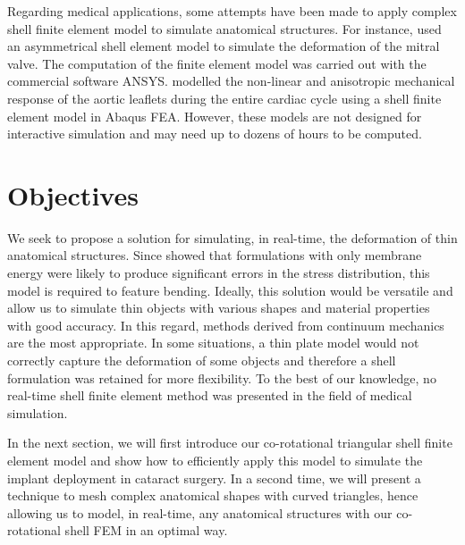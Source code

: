 Regarding medical applications, some attempts have been made to apply complex shell finite element model to simulate anatomical structures. For instance, \cite{Lim05} used an asymmetrical shell element model to simulate the deformation of the mitral valve. The computation of the finite element model was carried out with the commercial software ANSYS. \cite{Conti10} modelled the non-linear and anisotropic mechanical response of the aortic leaflets during the entire cardiac cycle using a shell finite element model in Abaqus FEA. However, these models are not designed for interactive simulation and may need up to dozens of hours to be computed. 


\section{Objectives}

We seek to propose a solution for simulating, in real-time, the deformation of thin anatomical structures. Since \cite{Black91} showed that formulations with only membrane energy were likely to produce significant errors in the stress distribution, this model is required to feature bending. Ideally, this solution would be versatile and allow us to simulate thin objects with various shapes and material properties with good accuracy. In this regard, methods derived from continuum mechanics are the most appropriate. In some situations, a thin plate model would not correctly capture the deformation of some objects and therefore a shell formulation was retained for more flexibility. To the best of our knowledge, no real-time shell finite element method was presented in the field of medical simulation.  

In the next section, we will first introduce our co-rotational triangular shell finite element model and show how to efficiently apply this model to simulate the implant deployment in cataract surgery. In a second time, we will present a technique to mesh complex anatomical shapes with curved triangles, hence allowing us to model, in real-time, any anatomical structures with our co-rotational shell FEM in an optimal way. 



